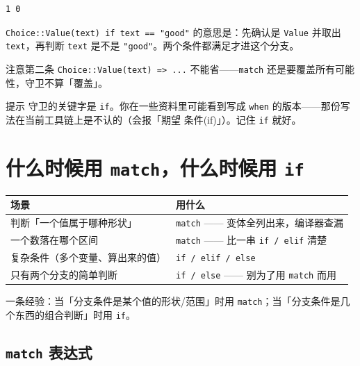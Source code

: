 \par
\medskip
\begin{lstlisting}[style=out]
1 0
\end{lstlisting}
\par
\medskip

\texttt{Choice:\allowbreak{}:\allowbreak{}Value(\allowbreak{}text)\allowbreak{} if text =\allowbreak{}=\allowbreak{} "good"} 的意思是：先确认是 \texttt{Value} 并取出 \texttt{text}，再判断 \texttt{text} 是不是 \texttt{"good"}。两个条件都满足才进这个分支。

注意第二条 \texttt{Choice:\allowbreak{}:\allowbreak{}Value(\allowbreak{}text)\allowbreak{} =\allowbreak{}>\allowbreak{} .\allowbreak{}.\allowbreak{}.\allowbreak{}} 不能省——\texttt{match} 还是要覆盖所有可能性，守卫不算「覆盖」。

\begin{tip}{提示}
守卫的关键字是 \texttt{if}。你在一些资料里可能看到写成 \texttt{when} 的版本——那份写法在当前工具链上是不认的（会报「期望 条件(if)」）。记住 \texttt{if} 就好。
\end{tip}

\section{什么时候用 \texttt{match}，什么时候用 \texttt{if}}

\begin{center}
\begin{tabular}{ll}
\toprule
场景 & 用什么 \\
\midrule
判断「一个值属于哪种形状」 & \texttt{match} —— 变体全列出来，编译器查漏 \\
一个数落在哪个区间 & \texttt{match} —— 比一串 \texttt{if /\allowbreak{} elif} 清楚 \\
复杂条件（多个变量、算出来的值） & \texttt{if /\allowbreak{} elif /\allowbreak{} else} \\
只有两个分支的简单判断 & \texttt{if /\allowbreak{} else} —— 别为了用 \texttt{match} 而用 \\
\bottomrule
\end{tabular}
\end{center}

一条经验：当「分支条件是某个值的形状/范围」时用 \texttt{match}；当「分支条件是几个东西的组合判断」时用 \texttt{if}。

\subsection*{\texttt{match} 表达式}


